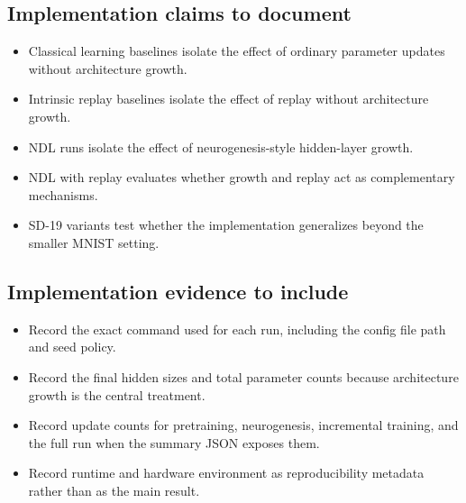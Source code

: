 \subsection{Implementation claims to document}
\begin{itemize}
  \item Classical learning baselines isolate the effect of ordinary parameter updates without architecture growth.
  \item Intrinsic replay baselines isolate the effect of replay without architecture growth.
  \item NDL runs isolate the effect of neurogenesis-style hidden-layer growth.
  \item NDL with replay evaluates whether growth and replay act as complementary mechanisms.
  \item SD-19 variants test whether the implementation generalizes beyond the smaller MNIST setting.
\end{itemize}

\subsection{Implementation evidence to include}
\begin{itemize}
  \item Record the exact command used for each run, including the config file path and seed policy.
  \item Record the final hidden sizes and total parameter counts because architecture growth is the central treatment.
  \item Record update counts for pretraining, neurogenesis, incremental training, and the full run when the summary JSON exposes them.
  \item Record runtime and hardware environment as reproducibility metadata rather than as the main result.
\end{itemize}
